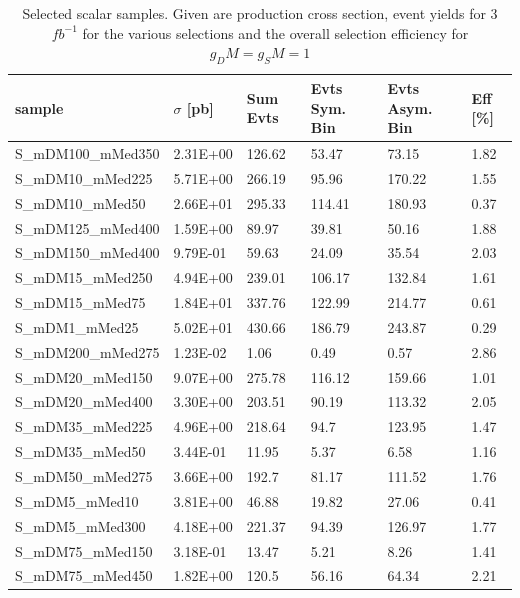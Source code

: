 \begin{table}[h]
\centering
\begin{tabular}{llllll}
\hline
sample             & $\sigma$ [pb] & Sum Evts       & Evts Sym. Bin & Evts Asym. Bin & Eff  [\%]   \\\hline
S\_mDM100\_mMed350 & 2.31E+00 & 126.62 & 53.47  & 73.15  & 1.82 \\
S\_mDM10\_mMed225  & 5.71E+00 & 266.19 & 95.96  & 170.22 & 1.55 \\
S\_mDM10\_mMed50   & 2.66E+01 & 295.33 & 114.41 & 180.93 & 0.37 \\
S\_mDM125\_mMed400 & 1.59E+00 & 89.97  & 39.81  & 50.16  & 1.88 \\
S\_mDM150\_mMed400 & 9.79E-01 & 59.63  & 24.09  & 35.54  & 2.03 \\
S\_mDM15\_mMed250  & 4.94E+00 & 239.01 & 106.17 & 132.84 & 1.61 \\
S\_mDM15\_mMed75   & 1.84E+01 & 337.76 & 122.99 & 214.77 & 0.61 \\
S\_mDM1\_mMed25    & 5.02E+01 & 430.66 & 186.79 & 243.87 & 0.29 \\
S\_mDM200\_mMed275 & 1.23E-02 & 1.06   & 0.49   & 0.57   & 2.86 \\
S\_mDM20\_mMed150  & 9.07E+00 & 275.78 & 116.12 & 159.66 & 1.01 \\
S\_mDM20\_mMed400  & 3.30E+00 & 203.51 & 90.19  & 113.32 & 2.05 \\
S\_mDM35\_mMed225  & 4.96E+00 & 218.64 & 94.7   & 123.95 & 1.47 \\
S\_mDM35\_mMed50   & 3.44E-01 & 11.95  & 5.37   & 6.58   & 1.16 \\
S\_mDM50\_mMed275  & 3.66E+00 & 192.7  & 81.17  & 111.52 & 1.76 \\
S\_mDM5\_mMed10    & 3.81E+00 & 46.88  & 19.82  & 27.06  & 0.41 \\
S\_mDM5\_mMed300   & 4.18E+00 & 221.37 & 94.39  & 126.97 & 1.77 \\
S\_mDM75\_mMed150  & 3.18E-01 & 13.47  & 5.21   & 8.26   & 1.41 \\
S\_mDM75\_mMed450  & 1.82E+00 & 120.5  & 56.16  & 64.34  & 2.21\\
\hline
\end{tabular}
\caption{Selected scalar samples. Given are production cross section, event yields for 3 $fb^{-1 }$ for the various selections and the overall selection efficiency for $g_DM=g_SM=1$}
\label{tab:dm_S_g1_3fb}
\end{table}


